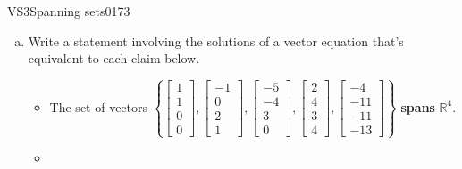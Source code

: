 \begin{exercise}{VS3}{Spanning sets}{0173} 
\begin{exerciseStatement} 

\begin{enumerate}[(a)]
\item  

 Write a statement involving the solutions of a vector equation that's equivalent to each claim below. 

 

\begin{itemize}
\item  

 The set of vectors \(\left\{ \left[\begin{array}{c}
1 \\
1 \\
0 \\
0
\end{array}\right] , \left[\begin{array}{c}
-1 \\
0 \\
2 \\
1
\end{array}\right] , \left[\begin{array}{c}
-5 \\
-4 \\
3 \\
0
\end{array}\right] , \left[\begin{array}{c}
2 \\
4 \\
3 \\
4
\end{array}\right] , \left[\begin{array}{c}
-4 \\
-11 \\
-11 \\
-13
\end{array}\right] \right\}\) \textbf{spans} \(\mathbb R^4\). 

 
\item  


\end{itemize}
\end{enumerate}
\end{exerciseStatement}
\end{exercise}
